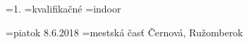 \rocnik={1.}              %
\kolo={kvalifikačné}      %
\sezona={indoor}          %

\kedy={piatok 8.6.2018}
\kde={mests\-ká časť Čer\-no\-vá, Ru\-žom\-be\-rok}
